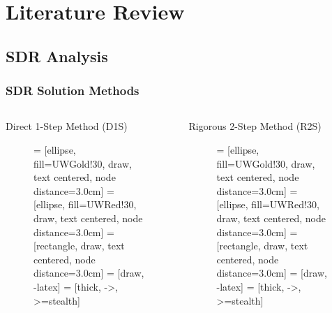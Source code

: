 \documentclass{beamer}
\begin{document}
\section{Literature Review}
\subsection{SDR Analysis}
\begin{frame}
\frametitle{SDR Solution Methods}

\begin{columns}
	\begin{block}{Direct 1-Step Method (D1S) \cite{d1s}}
	\vspace{1cm}
	\begin{figure}
        \centering

         = [ellipse, fill=UWGold!30, draw, text centered,
		node distance=3.0cm]
         = [ellipse, fill=UWRed!30, draw, text centered, node
		distance=3.0cm]
         = [rectangle, draw, text centered, node distance=3.0cm]
         = [draw, -latex]
         = [thick, ->, >=stealth]
        
        \end{figure}
\end{block}
	\begin{block}{Rigorous 2-Step Method (R2S) \cite{r2s}}
	\vspace{0.3cm}

	\begin{figure}
        \centering
         = [ellipse, fill=UWGold!30, draw, text centered,
		node distance=3.0cm]
         = [ellipse, fill=UWRed!30, draw, text centered, node
		distance=3.0cm]
         = [rectangle, draw, text centered, node distance=3.0cm]
         = [draw, -latex]
         = [thick, ->, >=stealth]
        

\end{figure}
\end{block}
\end{columns}
\end{frame}
\end{document}
